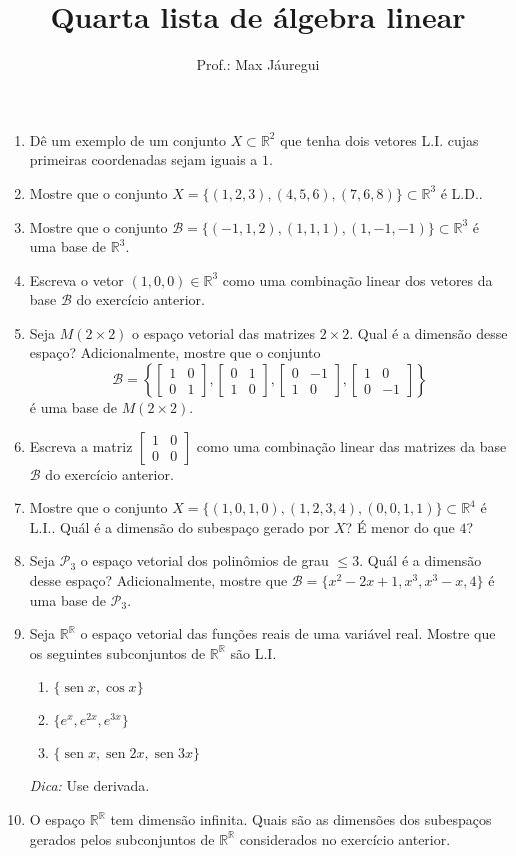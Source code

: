 \documentclass[a4paper]{article}
\title{Quarta lista de álgebra linear}
\author{Prof.: Max Jáuregui}
\date{}
\newcommand{\mc}{\mathcal}
\newcommand{\dcur}[1]{\left\{#1\right\}}
\newcommand{\R}{\mathbb{R}}
\DeclareMathOperator{\sen}{sen}
\begin{document}
\maketitle
\begin{enumerate}
\item Dê um exemplo de um conjunto $X\subset\R^2$ que tenha dois vetores L.I. cujas primeiras coordenadas sejam iguais a $1$.
\item Mostre que o conjunto $X=\{(1,2,3),(4,5,6),(7,6,8)\}\subset\R^3$ é L.D..
\item Mostre que o conjunto $\mc B=\{(-1,1,2),(1,1,1),(1,-1,-1)\}\subset\R^3$ é uma base de $\R^3$.
\item Escreva o vetor $(1,0,0)\in\R^3$ como uma combinação linear dos vetores da base $\mc B$ do exercício anterior.
\item Seja $M(2\times 2)$ o espaço vetorial das matrizes $2\times 2$. Qual é a dimensão desse espaço? Adicionalmente, mostre que o conjunto
  $$\mc B=\dcur{
    \begin{bmatrix}
      1&0\\
      0&1
    \end{bmatrix},\begin{bmatrix}
      0&1\\
      1&0
    \end{bmatrix},\begin{bmatrix}
      0&-1\\
      1&0
    \end{bmatrix},\begin{bmatrix}
      1&0\\
      0&-1
    \end{bmatrix}
  }$$
  é uma base de $M(2\times 2)$.
\item Escreva a matriz $
  \begin{bmatrix}
    1&0\\
    0&0
  \end{bmatrix}
$ como uma combinação linear das matrizes da base $\mc B$ do exercício anterior.
\item Mostre que o conjunto $X=\{(1,0,1,0),(1,2,3,4),(0,0,1,1)\}\subset\R^4$ é L.I.. Quál é a dimensão do subespaço gerado por $X$? É menor do que $4$?
\item Seja $\mc P_3$ o espaço vetorial dos polinômios de grau $\le 3$. Quál é a dimensão desse espaço? Adicionalmente, mostre que $\mc B=\{x^2-2x+1,x^3,x^3-x,4\}$ é uma base de $\mc P_3$.
\item Seja $\R^\R$ o espaço vetorial das funções reais de uma variável real. Mostre que os seguintes subconjuntos de $\R^\R$ são L.I.
  \begin{enumerate}
  \item $\{\sen x,\cos x\}$
  \item $\{e^x,e^{2x},e^{3x}\}$
  \item $\{\sen x,\sen 2x,\sen 3x\}$
  \end{enumerate}
  \textit{Dica:} Use derivada.
\item O espaço $\R^\R$ tem dimensão infinita. Quais são as dimensões dos subespaços gerados pelos subconjuntos de $\R^\R$ considerados no exercício anterior.
\end{enumerate}
\end{document}
